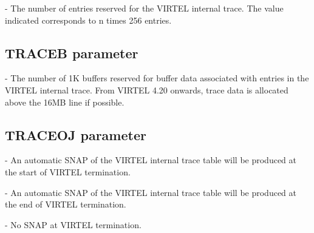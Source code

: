 \documentclass[letterpaper,10pt,english]{sphinxmanual}
\begin{document}
 - The number of entries reserved for the VIRTEL internal trace. The value indicated corresponds to n times 256 entries.

\ignorespaces 

\subsection{TRACEB parameter}
\label{\detokenize{Installation_Guide:traceb-parameter}}\label{\detokenize{Installation_Guide:index-128}}
\begin{sphinxVerbatim}[commandchars=\\\{\}]
 
\end{sphinxVerbatim}

 - The number of 1K buffers reserved for buffer data associated with entries in the VIRTEL internal trace. From VIRTEL 4.20 onwards, trace data is allocated above the 16MB line if possible.

\ignorespaces 

\subsection{TRACEOJ parameter}
\label{\detokenize{Installation_Guide:traceoj-parameter}}\label{\detokenize{Installation_Guide:index-129}}
\begin{sphinxVerbatim}[commandchars=\\\{\}]
 
\end{sphinxVerbatim}

 - An automatic SNAP of the VIRTEL internal trace table will be produced at the start of VIRTEL termination.

 - An automatic SNAP of the VIRTEL internal trace table will be produced at the end of VIRTEL termination.

 - No SNAP at VIRTEL termination.

\ignorespaces 
\end{document}
